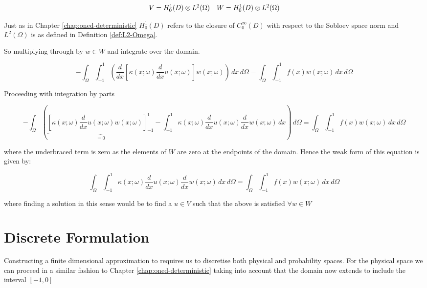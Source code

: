 \begin{equation}
    \begin{array}{c c}
        V = H^1_0(D) \otimes L^2(\Omega) &
        W = H^1_0(D) \otimes L^2(\Omega)
    \end{array}
\end{equation}

Just as in Chapter \ref{chap:oned-deterministic} $H^1_0(D)$ refers to the
closure of $C_0^\infty(D)$ with respect to the Sobloev space norm
 and $L^2(\Omega)$ is as defined in Definition
\ref{def:L2-Omega}.

So multiplying through by $w \in W$ and integrate over the
domain.

\begin{equation}
    -\int_{\Omega}\int_{-1}^1\left(\frac{d}{dx}\left[\kappa(x;\omega)\frac{d}{dx}u(x;\omega)\right]
    w(x;\omega)\right)\, dx\, d\Omega = \int_{\Omega}\int_{-1}^1 f(x)w(x;\omega)\, dx\, d\Omega
\end{equation}

Proceeding with integration by parts

\begin{equation}
    -\int_{\Omega}\left(
      \underbrace{\left[\kappa(x;\omega)\frac{d}{dx}u(x;\omega)
                        w(x;\omega)\right]_{-1}^1}_{= 0}
       -\int_{-1}^1\kappa(x;\omega)\frac{d}{dx}u(x;\omega)\frac{d}{dx}w(x;\omega)\, dx
    \right)\, d\Omega = \int_{\Omega}\int_{-1}^1 f(x)w(x;\omega)\, dx\, d\Omega
\end{equation}

where the underbraced term is zero as the elements of $W$ are zero at the
endpoints of the domain. Hence the weak form of this equation is given by:

\begin{equation}\label{eq:wk-one-d-stochastic}
    \int_{\Omega}\int_{-1}^1\kappa(x;\omega)
           \frac{d}{dx}u(x;\omega)\frac{d}{dx}w(x;\omega)\, dx\, d\Omega =
           \int_{\Omega}\int_{-1}^1 f(x)w(x;\omega)\, dx\, d\Omega
\end{equation}

where finding a solution in this sense would be to find a $u \in V$ such that
the above is satisfied $\forall w \in W$

\section{Discrete Formulation}

Constructing a finite dimensional approximation to
 requires us to discretise both physical and
probability spaces. For the physical space we can proceed in a similar fashion
to Chapter \ref{chap:oned-deterministic} taking into account that the domain
now extends to include the interval $[-1, 0]$

